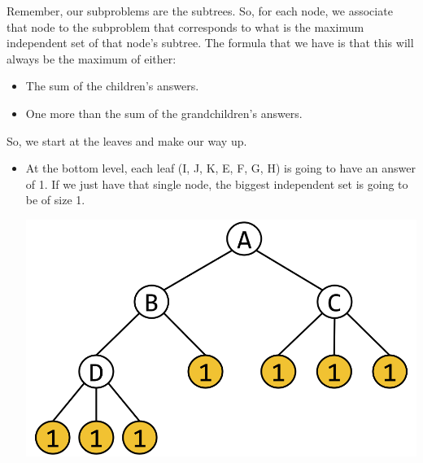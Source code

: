 \documentclass[letterpaper]{article}
\begin{document}
\begin{mdframed}[]
    Remember, our subproblems are the subtrees. So, for each node, we associate that node to the subproblem that corresponds to what is the maximum independent set of that node's subtree. The formula that we have is that this will always be the maximum of either: 
    \begin{itemize}
        \item The sum of the children's answers. 
        \item One more than the sum of the grandchildren's answers.
    \end{itemize}

    So, we start at the leaves and make our way up. 
    \begin{itemize}
        \item At the bottom level, each leaf (I, J, K, E, F, G, H) is going to have an answer of 1. If we just have that single node, the biggest independent set is going to be of size 1.
        \begin{center}
            \includegraphics[scale=0.2]{assets/indep_set_ex_1.png}
        \end{center}


\end{itemize}
\end{mdframed}
\end{document}
